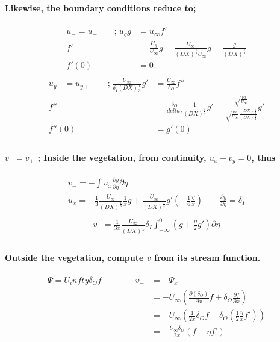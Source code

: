 \documentclass[11pt]{amsart}
\begin{document}
\paragraph{\\Likewise, the boundary conditions reduce to;}
\begin{align}
u_- = u_+  \qquad  \text{;} \; u_g g & = u_\infty f' \nonumber \\
f' & =  \frac{U_g}{U_\infty} g = \frac{U_\infty}{(DX)^\frac{1}{3}U_\infty}g = \frac{g}{(DX)^\frac{1}{3}} \nonumber  \\
f'(0) & = 0  \\ \nonumber
\end{align}
\begin{align}
u_{y-} = u_{y+}  \qquad  \text{;} \; \frac{U_\infty}{\delta_I (DX)\frac{1}{3}}g' & = \frac{U_\infty}{\delta_O}f'' \nonumber \\
f'' & =  \frac{\delta_O}{delta_I} \frac{1}{(DX)^\frac{1}{3}}g' = \frac{\sqrt{\frac{\nu x}{U_\infty}}}{\sqrt{\frac{\nu x}{U_\infty}}\frac{(DX)\frac{1}{3}}{(DX)\frac{1}{3}}}g' \nonumber  \\
f''(0) & = g'(0) \\ \nonumber
\end{align}
\paragraph{\(v_- = v_+\)  ;   Inside the vegetation, from continuity, \(u_x + v_y=0\), thus\\}
\begin{gather}
v_- = - \int u_x \frac{\partial y}{\partial \eta} \partial \eta \nonumber \\
u_x = - \frac{1}{3} \frac{U_\infty}{(DX)^\frac{1}{3}} \frac{1}{x}g + \frac{U_\infty}{(DX)^\frac{1}{3}}g'(-\frac{1}{6}\frac{\eta}{x}) \qquad \frac{\partial y}{\partial \eta} = \delta_I \nonumber \\ \nonumber
\end{gather}
\begin{align}
v_- = \frac{1}{3x} \frac{U_\infty}{(DX)^\frac{1}{3}} \delta_I \int_{-\infty}^0 (g +\frac{\eta}{2}g') \partial \eta \nonumber \\
\end{align}
\paragraph{Outside the vegetation, compute \(v\) from its stream function.\\}
\begin{align}
\Psi = U_infty \delta_O f \qquad \qquad v_+ & = - \Psi_x \nonumber \\ & = - U_\infty\left( \frac{\partial(\delta_O)}{\partial x}f + \delta_O \frac{\partial f}{\partial x}  \right) \nonumber \\ & = -U_\infty \left( \frac{1}{2x}\delta_Of + \delta_O( \frac{1}{2}\frac{\eta}{x}f' ) \right) \nonumber \\ & = - \frac{U_\infty \delta_O}{2x}(f-\eta f') \nonumber \\ \nonumber
\end{align}
\end{document}
